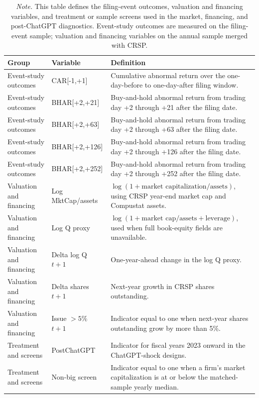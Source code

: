 \begin{table}[p]
\centering
\small
\setlength{\tabcolsep}{4pt}
\renewcommand{\arraystretch}{1.12}
\caption{Variable definitions: event, valuation, financing, and treatment variables}
\label{tab:appendix_var_defs_market}
\begin{tabularx}{\textwidth}{>{\raggedright\arraybackslash}p{}>{\raggedright\arraybackslash}p{}>{\raggedright\arraybackslash}X}
\hline
Group & Variable & Definition \\
\hline
Event-study outcomes & CAR[-1,+1] & Cumulative abnormal return over the one-day-before to one-day-after filing window. \\
Event-study outcomes & BHAR[+2,+21] & Buy-and-hold abnormal return from trading day +2 through +21 after the filing date. \\
Event-study outcomes & BHAR[+2,+63] & Buy-and-hold abnormal return from trading day +2 through +63 after the filing date. \\
Event-study outcomes & BHAR[+2,+126] & Buy-and-hold abnormal return from trading day +2 through +126 after the filing date. \\
Event-study outcomes & BHAR[+2,+252] & Buy-and-hold abnormal return from trading day +2 through +252 after the filing date. \\
Valuation and financing & Log MktCap/assets & $\log(1 + \text{market capitalization}/\text{assets})$, using CRSP year-end market cap and Compustat assets. \\
Valuation and financing & Log Q proxy & $\log(1 + \text{market cap}/\text{assets} + \text{leverage})$, used when full book-equity fields are unavailable. \\
Valuation and financing & Delta log Q $t{+}1$ & One-year-ahead change in the log Q proxy. \\
Valuation and financing & Delta shares $t{+}1$ & Next-year growth in CRSP shares outstanding. \\
Valuation and financing & Issue $>5\%$ $t{+}1$ & Indicator equal to one when next-year shares outstanding grow by more than 5\%. \\
Treatment and screens & PostChatGPT & Indicator for fiscal years 2023 onward in the ChatGPT-shock designs. \\
Treatment and screens & Non-big screen & Indicator equal to one when a firm's market capitalization is at or below the matched-sample yearly median. \\
\hline
\end{tabularx}
\caption*{\footnotesize \textit{Note.} This table defines the filing-event outcomes, valuation and financing variables, and treatment or sample screens used in the market, financing, and post-ChatGPT diagnostics. Event-study outcomes are measured on the filing-event sample; valuation and financing variables on the annual sample merged with CRSP.}
\end{table}
